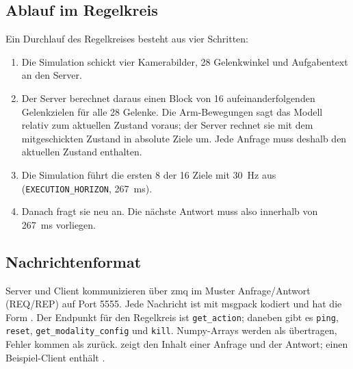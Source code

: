 \subsection{Ablauf im Regelkreis}
\label{sec:if-server-ablauf}

Ein Durchlauf des Regelkreises besteht aus vier Schritten:

\begin{enumerate}
  \item Die Simulation schickt vier Kamerabilder, 28 Gelenkwinkel und Aufgabentext an den
    Server.
  \item Der Server berechnet daraus einen Block von 16 aufeinanderfolgenden Gelenkzielen für
    alle 28 Gelenke. Die Arm-Bewegungen sagt das Modell relativ zum aktuellen Zustand voraus;
    der Server rechnet sie mit dem mitgeschickten Zustand in absolute Ziele um. Jede Anfrage
    muss deshalb den aktuellen Zustand enthalten.
  \item Die Simulation führt die ersten 8 der 16 Ziele mit 30~Hz aus
    (\texttt{EXECUTION\_HORIZON}, 267~ms).
  \item Danach fragt sie neu an. Die nächste Antwort muss also innerhalb von 267~ms vorliegen.
\end{enumerate}

\subsection{Nachrichtenformat}
\label{sec:if-server-format}

Server und Client kommunizieren über \ac{zmq} im Muster Anfrage/Antwort (REQ/REP) auf Port
5555. Jede Nachricht ist mit msgpack kodiert und hat die Form
. Der Endpunkt für den Regelkreis ist
\texttt{get\_action}; daneben gibt es \texttt{ping}, \texttt{reset},
\texttt{get\_modality\_config} und \texttt{kill}. Numpy-Arrays werden als
 übertragen, Fehler kommen als
 zurück.  zeigt den Inhalt einer Anfrage und der
Antwort; einen Beispiel-Client enthält .

